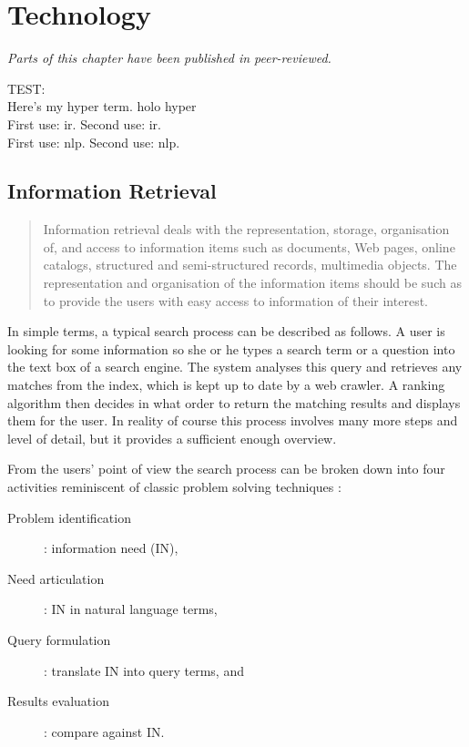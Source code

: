 
\chapter{Technology}
\label{ch:technology}

\emph{Parts of this chapter have been published in peer-reviewed.}

\grule

TEST:\\
Here’s my \gls{hyper} term. \gls{holo} \gls{hyper}\\
First use: \gls{ir}. Second use: \gls{ir}.\\
First use: \gls{nlp}. Second use: \gls{nlp}.



\section{Information Retrieval}

\begin{quote}
  Information retrieval deals with the representation, storage, organisation of, and access to information items such as documents, Web pages, online catalogs, structured and semi-structured records, multimedia objects. The representation and organisation of the information items should be such as to provide the users with easy access to information of their interest. \citep{Baeza-Yates2011}
\end{quote}

In simple terms, a typical search process can be described as follows. A user is looking for some information so she or he types a search term or a question into the text box of a search engine. The system analyses this query and retrieves any matches from the index, which is kept up to date by a web crawler. A ranking algorithm then decides in what order to return the matching results and displays them for the user. In reality of course this process involves many more steps and level of detail, but it provides a sufficient enough overview.

From the users' point of view the search process can be broken down into four activities \citep{Sutcliffe1998} reminiscent of classic problem solving techniques \citep{Polya1957}:

\begin{description}
  \item [Problem identification]: information need (IN),
  \item [Need articulation]: IN in natural language terms,
  \item [Query formulation]: translate IN into query terms, and
  \item [Results evaluation]: compare against IN.
\end{description}

